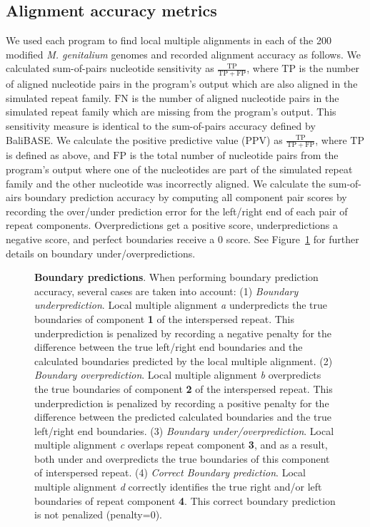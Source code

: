 \documentclass{llncs}
\begin{document}
\subsection{Alignment accuracy metrics}
\label{sec:metrics}
We used each program to find local multiple alignments in each of the
200 modified \emph{M. genitalium} genomes and recorded alignment
accuracy as follows. We calculated sum-of-pairs nucleotide sensitivity
as $\frac{\mathrm{TP}}{\mathrm{TP} + \mathrm{FP}}$, where
$\mathrm{TP}$ is the number of aligned nucleotide pairs in the
program's output which are also aligned in the simulated repeat
family.  $\mathrm{FN}$ is the number of aligned nucleotide pairs in
the simulated repeat family which are missing from the program's
output.  This sensitivity measure is identical to the sum-of-pairs
accuracy defined by BaliBASE\cite{ref-balibase}.  We calculate the
positive predictive value (PPV) as $\frac{\mathrm{TP}}{\mathrm{TP} +
\mathrm{FP}}$, where $\mathrm{TP}$ is defined as above, and
$\mathrm{FP}$ is the total number of nucleotide pairs from the
program's output where one of the nucleotides are part of the
simulated repeat family and the other nucleotide was incorrectly
aligned. We calculate the sum-of-airs boundary prediction accuracy by
computing all component pair scores by recording the over/under prediction
error for the left/right end of each pair of repeat components. Overpredictions get a positive score, underpredictions
a negative score, and perfect boundaries receive a 0 score. See Figure~\ref{fig-overunder} for 
further details on boundary under/overpredictions.

\begin{figure}[t]
\centering
{}
\caption{\textbf{Boundary predictions}. When performing boundary prediction accuracy, several cases are 
taken into account: (1) \emph{Boundary underprediction}. Local multiple alignment \emph{a} underpredicts the true boundaries
of component \textbf{1} of the interspersed repeat. This underprediction is penalized by recording a negative penalty for the difference
between the true left/right end boundaries and the calculated boundaries predicted by the local multiple alignment. (2) \emph{Boundary overprediction}. Local multiple alignment \emph{b} overpredicts the true boundaries of component \textbf{2} of the interspersed repeat. This underprediction is penalized by recording a positive penalty for the difference between the predicted calculated boundaries and the true left/right end boundaries. (3) \emph{Boundary under/overprediction}. Local multiple alignment \emph{c} overlaps repeat component \textbf{3}, and as a result, both under and overpredicts the true boundaries of this component of interspersed repeat. (4) \emph{Correct Boundary prediction}. Local multiple alignment \emph{d} correctly identifies the true right and/or left boundaries of repeat component \textbf{4}. This correct boundary prediction is not penalized (penalty=0).  }
\label{fig-overunder}
\end{figure}
\end{document}
